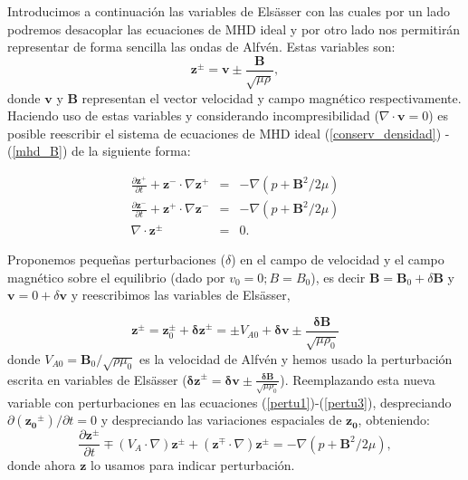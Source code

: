 \documentclass[a4paper,11pt]{report}
\begin{document}
Introducimos a continuación las variables de Elsässer \citep{elsasser_1950} con las cuales por un lado podremos desacoplar las ecuaciones de MHD ideal y por otro lado nos permitirán representar de forma sencilla las ondas de Alfvén. Estas variables son:
\begin{equation}
  \boldsymbol{z}^\pm = \boldsymbol{v} \pm \frac{\boldsymbol{B}}{\sqrt{\mu \rho}},
\end{equation}
donde $\boldsymbol{v}$ y $\boldsymbol{B}$ representan el vector velocidad y campo magnético respectivamente.
Haciendo uso de estas variables y considerando incompresibilidad ($\nabla \cdot \boldsymbol{v}=0$) es posible reescribir el sistema de ecuaciones de MHD ideal (\ref{conserv_densidad}) - (\ref{mhd_B}) de la siguiente forma:

\begin{eqnarray}
  \frac{\partial \boldsymbol{z}^+}{\partial t}+ \boldsymbol{z}^- \cdot \nabla \boldsymbol{z}^+ &=& -\nabla(p + \boldsymbol{B}^2/2\mu) \label{pertu1} \\
  \frac{\partial \boldsymbol{z}^-}{\partial t}+ \boldsymbol{z}^+ \cdot \nabla \boldsymbol{z}^- &=& -\nabla(p + \boldsymbol{B}^2/2\mu)\\
  \nabla \cdot \boldsymbol{z}^\pm &=& 0. \label{pertu3}
\end{eqnarray}

Proponemos pequeñas perturbaciones ($\delta$) en el campo de velocidad y el campo magnético sobre el equilibrio (dado por $v_0 = 0; B=B_0$), es decir $\boldsymbol{B} = \boldsymbol{B}_0 + \delta \boldsymbol{B}$ y $\boldsymbol{v} = 0 + \delta \boldsymbol{v}$ y reescribimos las variables de Elsässer,

\begin{equation}
  \boldsymbol{z}^\pm = \boldsymbol{z}^\pm _0 + \boldsymbol{\delta z} ^\pm = \pm V_{A0} + \boldsymbol{\delta v} \pm \frac{\boldsymbol{\delta B}}{\sqrt{\mu \rho_0}}
\end{equation}
donde $V_{A0} = \boldsymbol{B}_0/\sqrt{\rho \mu_0}$ es la velocidad de Alfvén y hemos usado la perturbación escrita en variables de Elsässer ($\boldsymbol{\delta z} ^\pm = \boldsymbol{\delta v} \pm \frac{\boldsymbol{\delta B}}{\sqrt{\mu \rho_0}}$). Reemplazando esta nueva variable con perturbaciones en las ecuaciones (\ref{pertu1})-(\ref{pertu3}), despreciando $\partial (\boldsymbol{z_0} ^\pm)/\partial t=0$ y despreciando las variaciones espaciales de $\boldsymbol{z_0}$, obteniendo:
\begin{equation}
  \frac{\partial \boldsymbol{z}^\pm}{\partial t}\mp (V_{A}\cdot \nabla)\boldsymbol{z}^\pm+(\boldsymbol{z}^\mp \cdot \nabla)\boldsymbol{z}^\pm= -\nabla(p + \boldsymbol{B}^2/2\mu), \label{pertu_f} 
\end{equation}
donde ahora $\boldsymbol{z}$ lo usamos para indicar perturbación.
\end{document}

